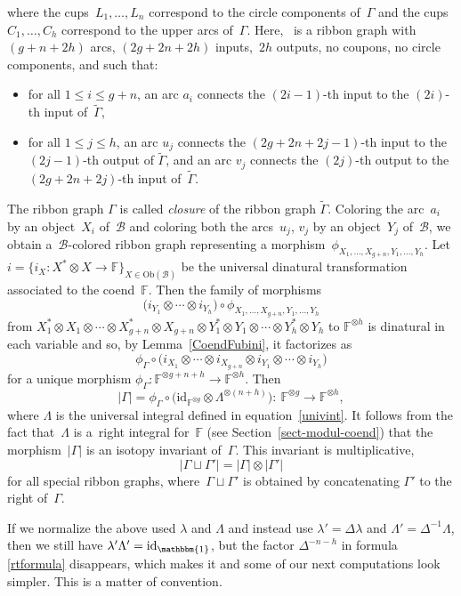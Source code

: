 \documentclass[10pt,a4paper]{amsart}
\numberwithin{equation}{section}
\newcommand{\co}{\colon}
\newcommand{\id}{\mathrm{id}}
\newcommand{\mc}{\mathcal}
\newcommand{\Ob}[1]{\mathrm{Ob}(#1)}
\newcommand{\uu}{\mathbbm{1}}
\newcommand{\coend}{\mathbb{F}}
\begin{document}
where the cups~$L_1, \dots, L_n$ correspond to the circle components of~$\Gamma$ and the cups~$C_1, \dots, C_h$ correspond to the upper arcs of~$\Gamma$.
Here,~\smash{$\widetilde{\Gamma}$} is a ribbon graph with~$(g+n+2h)$ arcs, $(2g+2n+2h)$ inputs,~$2h$ outputs, no coupons, no circle components, and such that:
\begin{itemize}\itemsep=0pt
	\item for all $1 \le i \le g+n$, an arc $a_i$ connects the $(2i-1)$-th input to the $(2i)$-th input of~$\widetilde{\Gamma}$,
	\item for all $1 \le j \le h$, an arc $u_j$ connects the $(2g+2n+2j-1)$-th input to the $(2j-1)$-th output of $\widetilde{\Gamma}$,
	and an arc $v_j$ connects the $(2j)$-th output to the $(2g+2n+2j)$-th input of~$\widetilde{\Gamma}$.
\end{itemize}
The ribbon graph ${\Gamma}$ is called \textit{closure} of the ribbon graph $\widetilde{\Gamma}$.
Coloring the arc~$a_i$ by an object~$X_i$ of~$\mc B$ and coloring both the arcs~$u_j$, $v_j$ by an object~$Y_j$ of~$\mc B$, we obtain a~$\mc B$-colored ribbon graph representing a morphism~$\phi_{X_1, \dots, X_{g+n}, Y_1, \dots, Y_h}$.
Let $i=\{i_X \co X^*\otimes X \to \coend\}_{X \in \Ob{\mc B}}$ be the universal dinatural transformation associated to the coend~$\coend$.
Then the family of morphisms
\[
\bigl(i_{Y_1} \otimes \cdots \otimes i_{Y_h}\bigr) \circ \phi_{X_1, \dots, X_{g+n}, Y_1, \dots, Y_h}
\]
from $X_1^* \otimes X_1 \otimes \cdots \otimes X_{g+n}^* \otimes X_{g+n} \otimes
Y_1^* \otimes Y_1 \otimes \cdots \otimes Y_h^* \otimes Y_h$ to $\coend^{\otimes h}$ is dinatural in each variable and so, by Lemma~\ref{CoendFubini}, it factorizes as
\[
\phi_{\Gamma} \circ \bigl(i_{X_1} \otimes \cdots \otimes i_{X_{g+n}} \otimes i_{Y_1} \otimes \cdots \otimes i_{Y_h}\bigr)
\]
for a unique morphism $\phi_{\Gamma} \co \coend^{\otimes g+n+h} \to \coend^{\otimes h}$. Then
\[
\lvert \Gamma \rvert=\phi_{\Gamma} \circ\bigl(\id_{\coend^{\otimes g}} \otimes \Lambda^{\otimes (n+h)}\bigr) \co\ \coend^{\otimes g} \to \coend^{\otimes h},
\]
where $\Lambda$ is the universal integral defined in equation~\eqref{univint}.
It follows from the fact that~$\Lambda$ is a~right integral for~$\coend$ (see Section~\ref{sect-modul-coend}) that the morphism~$\lvert \Gamma \rvert$ is an isotopy invariant of~$\Gamma$. This invariant is multiplicative,
\begin{equation*}%
\lvert \Gamma \sqcup \Gamma'\rvert=\lvert \Gamma \rvert \otimes \lvert \Gamma' \rvert
\end{equation*}
for all special ribbon graphs, where~$\Gamma \sqcup \Gamma'$ is obtained by concatenating $\Gamma'$ to the right of~$\Gamma$.
\begin{Remark} If we normalize the above used $\lambda$ and $\Lambda$ and instead use $\lambda'=\Delta \lambda$ and $\Lambda'= \Delta^{-1} \Lambda$, then we still have $\lambda'\Lambda'= \id_\uu$, but the factor $\Delta^{-n-h}$ in formula \eqref{rtformula} disappears, which makes it and some of our next computations look simpler. This is a matter of convention.
\end{Remark}
\end{document}
